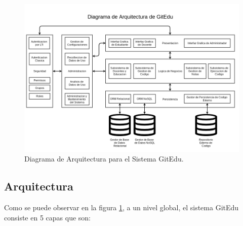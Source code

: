 \pagebreak

\begin{landscape}

	\begin{figure}
	  \begin{center}
	    \includegraphics[width=1.0\textwidth]{Figures/arq_ge.png}
	  \end{center}
	  \caption{Diagrama de Arquitectura para el Sistema GitEdu.}
	  \label{arq_ge}
	\end{figure}

\end{landscape}

\subsection{Arquitectura}
Como se puede observar en la figura \ref{arq_ge}, a un nivel global, el sistema GitEdu consiste en 5 capas que son:

